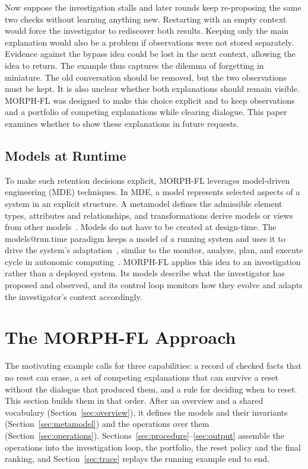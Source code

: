 \documentclass[a4paper,fleqn]{cas-sc}
\newcommand{\tool}{MORPH-FL}
\begin{document}
Now suppose the investigation stalls and later rounds keep re-proposing the same two checks without learning anything new. Restarting with an empty context would force the investigator to rediscover both results. Keeping only the main explanation would also be a problem if observations were not stored separately. Evidence against the bypass idea could be lost in the next context, allowing the idea to return. The example thus captures the dilemma of forgetting in miniature. The old conversation should be removed, but the two observations must be kept. It is also unclear whether both explanations should remain visible. \tool{} was designed to make this choice explicit and to keep observations and a portfolio of competing explanations while clearing dialogue. This paper examines whether to show these explanations in future requests.

\subsection{Models at Runtime}\label{sec:mde_background}
To make such retention decisions explicit, \tool{} leverages model-driven engineering (MDE) techniques. In MDE, a model represents selected aspects of a system in an explicit structure. A metamodel defines the admissible element types, attributes and relationships, and transformations derive models or views from other models~\citep{mde2006}. Models do not have to be created at design-time. The models@run.time paradigm keeps a model of a running system and uses it to drive the system's adaptation~\citep{modelsruntime2009}, similar to the monitor, analyze, plan, and execute cycle in autonomic computing~\citep{mapek2003}. \tool{} applies this idea to an investigation rather than a deployed system. Its models describe what the investigator has proposed and observed, and its control loop monitors how they evolve and adapts the investigator's context accordingly.

\section{The MORPH-FL Approach}\label{sec:approach}
The motivating example calls for three capabilities: a record of checked facts that no reset can erase, a set of competing explanations that can survive a reset without the dialogue that produced them, and a rule for deciding when to reset. This section builds them in that order. After an overview and a shared vocabulary (Section~\ref{sec:overview}), it defines the models and their invariants (Section~\ref{sec:metamodel}) and the operations over them (Section~\ref{sec:operations}). Sections~\ref{sec:procedure}--\ref{sec:output} assemble the operations into the investigation loop, the portfolio, the reset policy and the final ranking, and Section~\ref{sec:trace} replays the running example end to end.
\end{document}
